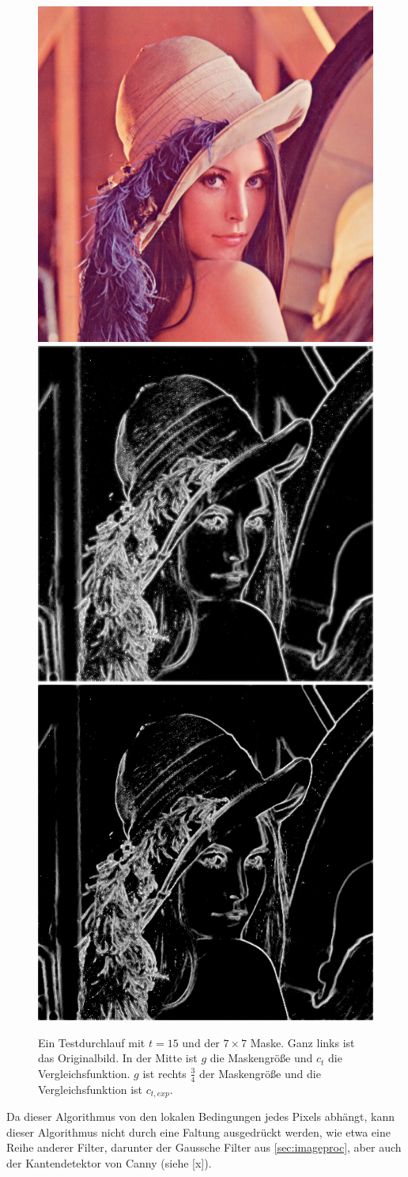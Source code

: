 \documentclass[a4paper, 11pt]{report}
\theoremstyle{definition}
\begin{document}
			\begin{figure}[H]\centering
				\includegraphics[width=.3\textwidth]{../examples/lena/lena.png}\quad
				\includegraphics[width=.3\textwidth]{../examples/lena/no-geom_raw.png}\quad
				\includegraphics[width=.3\textwidth]{../examples/lena/15_out_raw.png}
				\caption{Ein Testdurchlauf mit $t=15$ und der $7\times 7$ Maske. Ganz links ist das Originalbild. In der Mitte ist $g$ die Maskengröße und $c_t$ die Vergleichsfunktion. $g$ ist rechts $\frac{3}{4}$ der Maskengröße und die Vergleichsfunktion ist $c_{t,exp}$.}
				\label{fig:lena_first_test}
			\end{figure}

			Da dieser Algorithmus von den lokalen Bedingungen jedes Pixels abhängt, kann dieser Algorithmus nicht durch eine Faltung ausgedrückt werden, wie etwa eine Reihe anderer Filter, darunter der Gaussche Filter aus \ref{sec:imageproc}, aber auch der Kantendetektor von Canny (siehe [x]).
\end{document}
